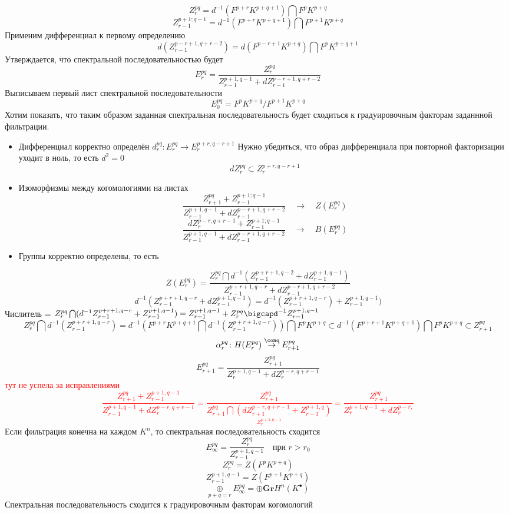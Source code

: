 \documentclass[../main.tex]{subfiles}
\begin{document}
\[
Z_r^{pq} = d^{-1}(F^{p+r}K^{p+q+1})\bigcap F^p K^{p+q}
\]
\[
Z^{p+1; q-1}_{r-1} = d^{-1}(F^{p+r}K^{p+q+1})\bigcap F^{p+1}K^{p+q}
\]
Применим дифференциал к первому определению 
\[
d (Z_{r-1}^{p-r+1, q+r-2}) = d( F^{p-r+1}K^{p+q})\bigcap F^p K^{p+q+1}
\]
Утверждается, что спектральной последовательностью будет
\[
E^{pq}_r = \dfrac{Z_r^{pq}}{Z^{p+1, q-1}_{r-1} + dZ_{r-1}^{p-r+1, q+r-2}}
\]
Выписываем первый лист спектральной последовательности 
\[
E_0^{pq} = F^p K^{p+q} / F^{p+1}K^{p+q}
\]
Хотим показать, что таким образом заданная спектральная последовательность будет сходиться к градуировочным факторам заданнной фильтрации.
\begin{itemize}
    \item Дифференциал корректно определён $d_r^{pq}\colon E_r^{pq} \to E_r^{p+r, q-r+1}$
    Нужно убедиться, что образ дифференциала при повторной факторизации уходит в ноль, то есть $d^2 = 0$
    \[dZ_r^{pq}\subset Z_r^{p+r, q-r+1}\]
    \item Изоморфизмы между когомологиями на листах
    \[\dfrac{Z^{pq}_{r+1} + Z^{p+1; q-1}_{r-1}}{Z_{r-1}^{p+1, q-1} + dZ_{r-1}^{p-r+1, q+r-2}}\quad\to\quad Z(E_r^{pq})\]
    \[
    \dfrac{dZ^{p-r, q+r-1}_{r} + Z^{p+1; q-1}_{r-1}}{Z_{r-1}^{p+1, q-1} + dZ_{r-1}^{p-r+1, q+r-2}}\quad\to\quad B(E_r^{pq})
    \]
    \item Группы корректно определены, то есть 
\end{itemize}
\[
Z(E^{pq}_r)=\dfrac{Z_r^{pq}\bigcap d^{-1}(Z_{r-1}^{p+r+1, q-2}+dZ_{r-1}^{p+1, q-1})}{Z_{r-1}^{p+r+1, q-r} + dZ_{r-1}^{p-r+1, q+r-2}}
\]
\[
d^{-1}(Z_{r-1}^{p+r+1, q-r}+dZ_{r-1}^{p+1, q-1}) = d^{-1}(Z_{r-1}^{p+r+1, q-r})+Z_{r-1}^{p+1, q-1})
\]
Числитель = $
Z_r^{pq}\bigcap (d^{-1}Z_{r-1}^{p+r+1, q-r}+Z_{r-1}^{p+1, q-1}) = Z_{r-1}^{p+1, q-1}+Z_r^{pq}\bigcapd^{-1}Z_{r-1}^{p+1, q-1}
$
\[
Z_r^{pq}\bigcap d^{-1} (Z_{r-1}^{p+r+1, q-r}) = d^{-1}\left(F^{p+r}K^{p+q+1}\bigcap d^{-1}(Z_{r-1}^{p+r+1, q-r})\right)\bigcap F^p K^{p+q} \subset d^{-1}\left(F^{p+r+1}K^{p+q+1}\right)\bigcap F^pK^{p+q}\subset Z_{r+1}^{pq}
\]
\[
\alpha_r^{pq}\colon H(E_r^{pq})\overset{\conq}{\to} E_{r+1}^{pq}
\]
\[
E_{r+1}^{pq} = \dfrac{Z^{pq}_{r+1}}{Z_r^{p+1, q-1}+dZ_r^{p-r, q+r-1}}
\]
\textcolor{red}{ тут не успела за исправлениями 
\[
\dfrac{Z_{r+1}^{pq}+Z_{r-1}^{p+1, q-1}}{Z_{r-1}^{p+1, q-1}+dZ_r^{p-r, q+r-1}}= \dfrac{Z_{r+1}^{pq}}{\underset{Z_r^{p+1, q-1}}{Z_{r+1}^{pq}\bigcap(dZ_{r+1}^{p-r, q+r-1}+Z_{r-1}^{p+1, q})}} = \dfrac{Z_{r+1}^{pq}}{Z_r^{p+1, q-1}+dZ_r^{p-r, }}
\]
}
Если фильтрация конечна на каждом $K^n$, то спектральная последовательность сходится 
\[
E_{\infty}^{pq} = \dfrac{Z_r^{pq}}{Z_{r-1}^{p+1, q-1}} \quad \text{при } r > r_0
\]
\[
Z_r^{pq} = Z(F^p K^{p+q})
\]
\[
Z_{r-1}^{p+1, q-1} = Z(F^{p+1}K^{p+q})
\]
\[
\underset{p+q=r}{\oplus}E_{\infty}^{pq} = \oplus \mathbf{Gr} H^n (K^\bullet)
\]
Спектральная последовательность сходится к градуировочным факторам когомологий 
\end{document}
